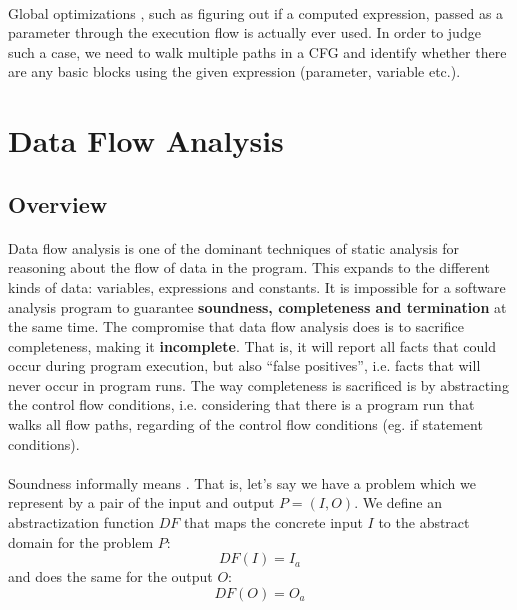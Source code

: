 \paragraph*{}
Global optimizations \cite[need to analyze the entire control flow graph of a program]{cfg-dcc}, such as figuring out if a computed expression, passed as a parameter through the execution flow is actually ever used. In order to judge such a case, we need to walk multiple paths in a CFG and identify whether there are any basic blocks using the given expression (parameter, variable etc.).

\section{Data Flow Analysis}
\subsection{Overview}
\paragraph*{}
Data flow analysis is one of the dominant techniques of static analysis for reasoning about the flow of data in the program. This expands to the different kinds of data: variables, expressions and constants. It is impossible for a software analysis program to guarantee \textbf{soundness, completeness and termination} at the same time. The compromise that data flow analysis does is to sacrifice completeness, making it \textbf{incomplete}. That is, it will report all facts that could occur during program execution, but also ``false positives'', i.e. facts that will never occur in program runs. The way completeness is sacrificed is by abstracting the control flow conditions, i.e. considering that there is a program run that walks all flow paths, regarding of the control flow conditions (eg. if statement conditions).

\paragraph*{}
Soundness informally means \cite[that the flow functions map abstract information before each instruction to abstract information after that instruction in a way that matches the instruction's concrete semantics]{program-analysis-corectness-cmu}. That is, let's say we have a problem which we represent by a pair of the input and output $P=(I, O)$. We define an abstractization function $DF$ that maps the concrete input $I$ to the abstract domain for the problem $P$:
$$DF(I) = I_a$$
and does the same for the output $O$:
$$DF(O) = O_a$$

